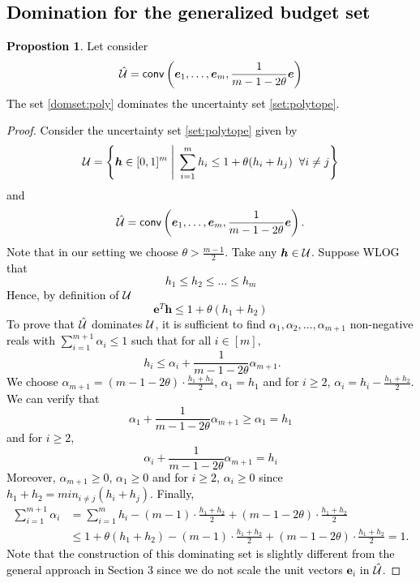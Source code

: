 \documentclass[11pt]{article}
\theoremstyle{plain}
\theoremstyle{definition}
\newtheorem{prop}[theorem]{Propostion}
\numberwithin{equation}{section}%
\numberwithin{equation}{section}%
\newcommand{\mb}[1]{\ensuremath{\boldsymbol{#1}}}
\newcommand*{\red}{\textcolor{black}}
\begin{document}
\begin{appendix}
\red{
\section{Domination for the generalized budget set}\label{apx-prop:poly}
\begin{prop} \label{prop:poly}
Let consider
\begin{equation}\label{domset:poly}
{\hat{\cal U}}= {\sf conv} \left( \mb e_1, \ldots, \mb e_m, \frac{1}{m-1-2\theta} \mb e \right)
\end{equation}
The set \eqref{domset:poly} dominates the uncertainty set \eqref{set:polytope}.
\end{prop}
\begin{proof}
Consider the uncertainty set \eqref{set:polytope} given by
$${\cal U}= \left\{ \mb h \in [0,1]^m \; \Bigg\vert \; \sum_{i=1}^m h_i \leq 1 + \theta ( h_i +h_j) \; \; \forall i \neq j \right\}$$
and
$${\hat{\cal U}}= {\sf conv} \left( \mb e_1, \ldots, \mb e_m, \frac{1}{m-1-2\theta} \mb e \right).$$
Note that in our setting we choose $ \theta > \frac{m-1}{2}$.
Take any $\mb h \in {\cal U}$. Suppose WLOG that
$$ h_1 \leq h_2 \leq \ldots \leq h_m $$
Hence, by definition of ${\cal U}$
$$ \mb e^T \mb h \leq 1+ \theta ( h_1+h_2) $$
To prove that $\hat{ \cal U}$ dominates ${ \cal U}$, it is sufficient to find $ \alpha_1, \alpha_2,\ldots,\alpha_{m+1}$ non-negative reals with $\sum_{i=1}^{m+1} \alpha_i \leq 1$ such that for all $ i \in [m],$ $$ \; h_i \leq  \alpha_i + \frac{1}{m-1-2\theta}\alpha_{m+1}.$$
We choose $\alpha_{m+1} = (m-1-2\theta) \cdot \frac{h_1+h_2}{2} $, $\alpha_1=h_1$ and   for $i \geq 2$, $\alpha_i = h_i -  \frac{h_1+h_2}{2}$.
We can verify that
$$ \alpha_1+  \frac{1}{m-1-2\theta} \alpha_{m+1}  \geq  \alpha_1 =h_1 $$
and for $ i \geq 2$,
$$ \alpha_i +  \frac{1}{m-1-2\theta} \alpha_{m+1}  =h_i $$
Moreover, $\alpha_{m+1} \geq 0$, $\alpha_1 \geq 0$ and for $i \geq 2$, $\alpha_i \geq 0$ since $h_1+h_2= min_{i\neq j} (h_i+h_j)$. Finally,
\begin{align*}
\sum_{i=1}^{m+1} \alpha_i &= \sum_{i=1}^{m} h_i - (m-1)\cdot \frac{h_1+h_2}{2}+ (m-1-2\theta) \cdot \frac{h_1+h_2}{2}\\
& \leq 1+ \theta ( h_1+h_2) - (m-1)\cdot \frac{h_1+h_2}{2}+ (m-1-2\theta) \cdot \frac{h_1+h_2}{2} =1.
\end{align*}
Note that the construction of this dominating set is slightly different from the general approach in Section 3 since we do not scale the unit vectors $\mb e_i$ in ${\hat{\cal U}}$.
\end{proof}
}




\end{appendix}
\end{document}
